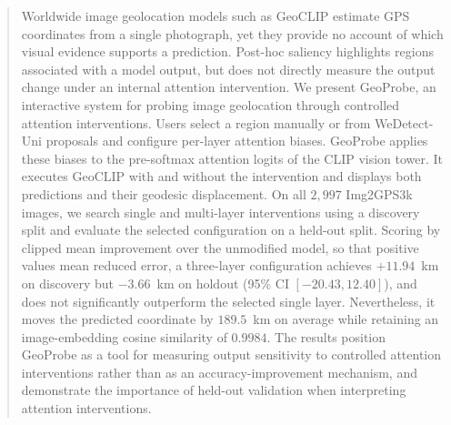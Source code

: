 \begin{abstract}
Worldwide image geolocation models such as GeoCLIP estimate GPS coordinates
from a single photograph, yet they provide no account of which visual evidence
supports a prediction. Post-hoc saliency highlights regions associated with
a model output, but does not directly measure the output change under an
internal attention intervention. We present GeoProbe, an interactive system for probing image geolocation through controlled attention interventions. Users select a region manually or from WeDetect-Uni proposals and configure per-layer attention biases. GeoProbe applies these biases to the pre-softmax attention logits of the CLIP vision tower. It executes GeoCLIP with and without the
intervention and displays both predictions and their geodesic displacement.
On all $2{,}997$ Img2GPS3k images, we search single and multi-layer
interventions using a discovery split and evaluate the selected configuration
on a held-out split. Scoring by clipped mean improvement over the unmodified
model, so that positive values mean reduced error, a three-layer configuration
achieves $+11.94$~km on discovery but $-3.66$~km on holdout
(95\% CI $[-20.43,12.40]$), and does not significantly outperform the
selected single layer. Nevertheless, it moves the predicted coordinate by
$189.5$~km on average while retaining an image-embedding cosine similarity of
$0.9984$. The results position
GeoProbe as a tool for measuring output sensitivity to controlled attention
interventions rather than as an accuracy-improvement mechanism, and demonstrate
the importance of held-out validation when interpreting attention
interventions.

\end{abstract}
